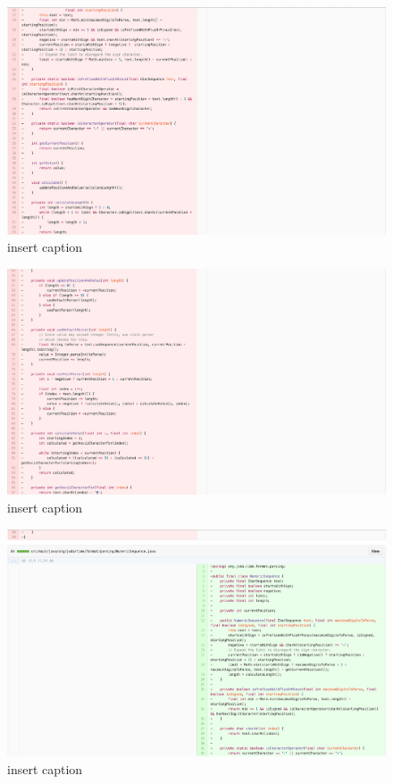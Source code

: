 \begin{figure}[H]
	\centering
	\includegraphics[width=\linewidth]{code133}
	\caption{insert caption}
\end{figure}
\begin{figure}[H]
	\centering
	\includegraphics[width=\linewidth]{code134}
	\caption{insert caption}
\end{figure}
\begin{figure}[H]
	\centering
	\includegraphics[width=\linewidth]{code135}
	\caption{insert caption}
\end{figure}
